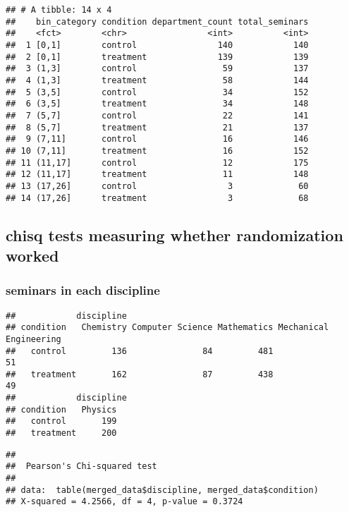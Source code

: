 \documentclass[
]{article}
\begin{document}
\begin{verbatim}
## # A tibble: 14 x 4
##    bin_category condition department_count total_seminars
##    <fct>        <chr>                <int>          <int>
##  1 [0,1]        control                140            140
##  2 [0,1]        treatment              139            139
##  3 (1,3]        control                 59            137
##  4 (1,3]        treatment               58            144
##  5 (3,5]        control                 34            152
##  6 (3,5]        treatment               34            148
##  7 (5,7]        control                 22            141
##  8 (5,7]        treatment               21            137
##  9 (7,11]       control                 16            146
## 10 (7,11]       treatment               16            152
## 11 (11,17]      control                 12            175
## 12 (11,17]      treatment               11            148
## 13 (17,26]      control                  3             60
## 14 (17,26]      treatment                3             68
\end{verbatim}

\newpage

\subsection{chisq tests measuring whether randomization
worked}\label{chisq-tests-measuring-whether-randomization-worked}

\subsubsection{seminars in each
discipline}\label{seminars-in-each-discipline}

\begin{verbatim}
##            discipline
## condition   Chemistry Computer Science Mathematics Mechanical Engineering
##   control         136               84         481                     51
##   treatment       162               87         438                     49
##            discipline
## condition   Physics
##   control       199
##   treatment     200
\end{verbatim}

\begin{verbatim}
## 
##  Pearson's Chi-squared test
## 
## data:  table(merged_data$discipline, merged_data$condition)
## X-squared = 4.2566, df = 4, p-value = 0.3724
\end{verbatim}
\end{document}
